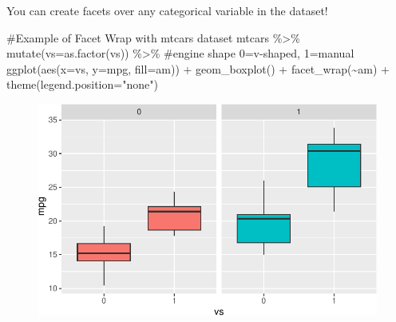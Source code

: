 \documentclass[
  letterpaper,
  DIV=11,
  numbers=noendperiod]{scrartcl}
\newenvironment{Shaded}{\begin{snugshade}}{\end{snugshade}}
\newcommand{\AttributeTok}[1]{\textcolor[rgb]{0.40,0.45,0.13}{#1}}
\newcommand{\CommentTok}[1]{\textcolor[rgb]{0.37,0.37,0.37}{#1}}
\newcommand{\FunctionTok}[1]{\textcolor[rgb]{0.28,0.35,0.67}{#1}}
\newcommand{\NormalTok}[1]{\textcolor[rgb]{0.00,0.23,0.31}{#1}}
\newcommand{\SpecialCharTok}[1]{\textcolor[rgb]{0.37,0.37,0.37}{#1}}
\newcommand{\StringTok}[1]{\textcolor[rgb]{0.13,0.47,0.30}{#1}}
\begin{document}
You can create facets over any categorical variable in the dataset!

\begin{Shaded}
\begin{Highlighting}[]
\CommentTok{\#Example of Facet Wrap with \textasciigrave{}mtcars\textasciigrave{} dataset}
\NormalTok{mtcars }\SpecialCharTok{\%\textgreater{}\%} 
  \FunctionTok{mutate}\NormalTok{(}\AttributeTok{vs=}\FunctionTok{as.factor}\NormalTok{(vs)) }\SpecialCharTok{\%\textgreater{}\%} \CommentTok{\#engine shape 0=v{-}shaped, 1=manual}
  \FunctionTok{ggplot}\NormalTok{(}\FunctionTok{aes}\NormalTok{(}\AttributeTok{x=}\NormalTok{vs, }\AttributeTok{y=}\NormalTok{mpg, }\AttributeTok{fill=}\NormalTok{am)) }\SpecialCharTok{+}
  \FunctionTok{geom\_boxplot}\NormalTok{() }\SpecialCharTok{+} 
  \FunctionTok{facet\_wrap}\NormalTok{(}\SpecialCharTok{\textasciitilde{}}\NormalTok{am) }\SpecialCharTok{+} 
  \FunctionTok{theme}\NormalTok{(}\AttributeTok{legend.position=}\StringTok{"none"}\NormalTok{) }
\end{Highlighting}
\end{Shaded}

\begin{figure}[H]

{\centering \includegraphics{118_F_ggplot2_files/figure-pdf/unnamed-chunk-12-1.pdf}

}

\end{figure}
\end{document}
